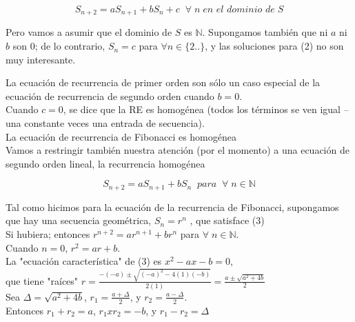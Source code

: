 \documentclass{article}
\begin{document}
\begin{equation}
  S_{n+2} = aS_{n+1} + bS_{n} + c \;\; \forall\; n \; \textit{en el dominio de} \; S
\end{equation}

Pero vamos a asumir que el dominio de $S$ es $\mathbb{N}$. Supongamos también que ni $a$ ni $b$ son $0$; de lo contrario, $S_n = c$ para $\forall n \in  \{2.. \}$, y las soluciones para (2) no son muy interesante.

La ecuación de recurrencia de primer orden son sólo un caso especial de la ecuación de recurrencia de  segundo orden  cuando $b = 0$.\\

Cuando $c = 0$, se dice que la RE es homogénea (todos los términos se ven igual – una constante veces una entrada de secuencia).\\

La ecuación de recurrencia de Fibonacci es homogénea \\

Vamos a restringir también nuestra atención (por el momento) a una ecuación de segundo orden lineal, la recurrencia homogénea

\begin{equation}
S_{n+2} = aS_{n+1} + bS_{n}\;\; \textit{para} \;\; \forall\; n \in \mathbb{N}
\end{equation}

Tal como hicimos para la ecuación de la recurrencia de Fibonacci, supongamos que hay una secuencia geométrica, $S_n = r^n$ , que satisface (3)\\

Si hubiera; entonces $r^{n+2} = ar^{n+1} + br^{n}$ para $\forall \; n \in \mathbb{N}$.\\

Cuando $n = 0$, $r^2 = ar + b$.\\

La "ecuación característica" de (3) es $x^2 -ax-b=0$,\\

que tiene "raíces" $r = \frac{-(-a) \pm \sqrt{(-a)^2 - 4(1)(-b)}}{2(1)} = \frac{a \pm \sqrt{a^2 + 4b}}{2}$\\

Sea $\Delta = \sqrt{a^2 + 4b}$, $r_1 = \frac{a + \Delta}{2}$, y $r_2 = \frac{a - \Delta}{2}$.\\

Entonces $r_1 + r_2 = a$, $r_1 \textit{x} r_2 = -b$, y $r_1 - r_2 = \Delta $ \\
\end{document}
